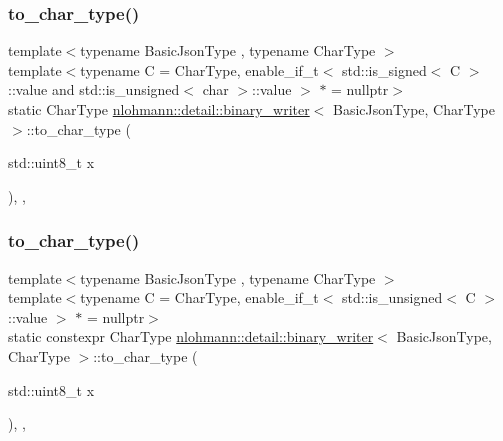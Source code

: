 \subsubsection{\texorpdfstring{to\_char\_type()}{to\_char\_type()}\hspace{0.1cm}{\footnotesize\ttfamily [2/4]}}
{\footnotesize\ttfamily template$<$typename Basic\+Json\+Type , typename Char\+Type $>$ \\
template$<$typename C  = Char\+Type, enable\+\_\+if\+\_\+t$<$ std\+::is\+\_\+signed$<$ C $>$\+::value and std\+::is\+\_\+unsigned$<$ char $>$\+::value $>$ $\ast$  = nullptr$>$ \\
static Char\+Type \mbox{\hyperlink{classnlohmann_1_1detail_1_1binary__writer}{nlohmann\+::detail\+::binary\+\_\+writer}}$<$ Basic\+Json\+Type, Char\+Type $>$\+::to\+\_\+char\+\_\+type (\begin{DoxyParamCaption}\item[{std\+::uint8\+\_\+t}]{x }\end{DoxyParamCaption})\hspace{0.3cm}{\ttfamily [inline]}, {\ttfamily [static]}, {\ttfamily [noexcept]}}

\mbox{\label{classnlohmann_1_1detail_1_1binary__writer_ab77aa48692bd4e64e4f051ce6aeb6d2d}} 
\subsubsection{\texorpdfstring{to\_char\_type()}{to\_char\_type()}\hspace{0.1cm}{\footnotesize\ttfamily [3/4]}}
{\footnotesize\ttfamily template$<$typename Basic\+Json\+Type , typename Char\+Type $>$ \\
template$<$typename C  = Char\+Type, enable\+\_\+if\+\_\+t$<$ std\+::is\+\_\+unsigned$<$ C $>$\+::value $>$ $\ast$  = nullptr$>$ \\
static constexpr Char\+Type \mbox{\hyperlink{classnlohmann_1_1detail_1_1binary__writer}{nlohmann\+::detail\+::binary\+\_\+writer}}$<$ Basic\+Json\+Type, Char\+Type $>$\+::to\+\_\+char\+\_\+type (\begin{DoxyParamCaption}\item[{std\+::uint8\+\_\+t}]{x }\end{DoxyParamCaption})\hspace{0.3cm}{\ttfamily [inline]}, {\ttfamily [static]}, {\ttfamily [noexcept]}}

